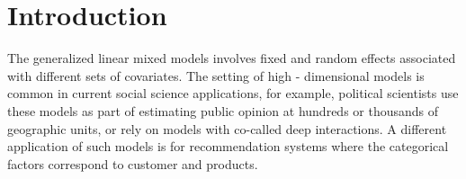 \documentclass[]{report}
\theoremstyle{definition}
\begin{document}
	
	\thispagestyle{empty}
	\chapter{Introduction}
    \label{chap:introduction}

    The generalized linear mixed models involves fixed and random effects associated with different sets of covariates. The setting of high - dimensional models is common in current social science applications, for example, political scientists use these models as part of estimating public opinion at hundreds or thousands of geographic units, or rely on models with co-called deep interactions. A different application of such models is for recommendation systems where the categorical factors correspond to customer and products.
\end{document}
